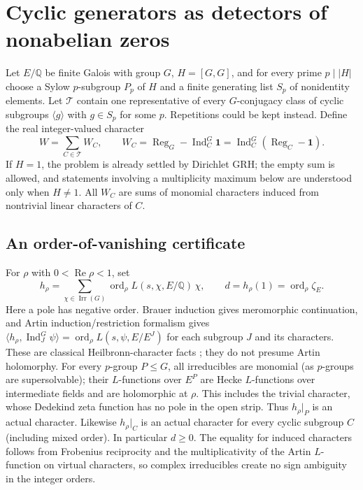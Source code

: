 \documentclass[11pt]{article}
\theoremstyle{remark}\newtheorem{remark}[theorem]{Remark}
\DeclareMathOperator{\ord}{ord}
\DeclareMathOperator{\Ind}{Ind}
\DeclareMathOperator{\Reg}{Reg}
\DeclareMathOperator{\Ree}{Re}
\newcommand{\Q}{\mathbb Q}
\newcommand{\one}{\mathbf 1}
\begin{document}
\section{Cyclic generators as detectors of nonabelian zeros}
Let $E/\Q$ be finite Galois with group $G$, $H=[G,G]$, and for every
prime $p\mid |H|$ choose a Sylow $p$-subgroup $P_p$ of $H$ and a
finite generating list $S_p$ of nonidentity elements. Let $\mathcal T$
contain one representative of every $G$-conjugacy class of cyclic
subgroups $\langle g\rangle$ with $g\in S_p$ for some $p$. Repetitions
could be kept instead. Define the real integer-valued character
\begin{equation}\label{eq:W}
 W=\sum_{C\in\mathcal T} W_C,\qquad
 W_C=\Reg_G-\Ind_C^G\one
     =\Ind_C^G(\Reg_C-\one).
\end{equation}
If $H=1$, the problem is already settled by Dirichlet GRH; the empty
sum is allowed, and statements involving a multiplicity maximum below
are understood only when $H\ne1$. All $W_C$ are sums of monomial
characters induced from nontrivial linear characters of $C$.

\subsection{An order-of-vanishing certificate}
For $\rho$ with $0<\Ree\rho<1$, set
\[
 h_\rho=\sum_{\chi\in\operatorname{Irr}(G)}
    \ord_\rho L(s,\chi,E/\Q)\,\chi,\qquad
 d=h_\rho(1)=\ord_\rho\zeta_E.
\]
Here a pole has negative order. Brauer induction gives meromorphic
continuation, and Artin induction/restriction formalism gives
$\langle h_\rho,\Ind_J^G\psi\rangle=\ord_\rho L(s,\psi,E/E^J)$
for each subgroup $J$ and its characters. These are classical
Heilbronn-character facts \cite{heilbronn}; they do not presume Artin
holomorphy. For every $p$-group $P\le G$, all irreducibles are monomial
(as $p$-groups are supersolvable); their $L$-functions over $E^P$ are
Hecke $L$-functions over intermediate fields and are holomorphic at
$\rho$. This includes the trivial character, whose Dedekind zeta
function has no pole in the open strip. Thus $h_\rho|_P$ is an actual
character. Likewise $h_\rho|_C$ is an actual character for every
cyclic subgroup $C$ (including mixed order). In particular $d\ge0$.
The equality for induced characters follows from Frobenius reciprocity
and the multiplicativity of the Artin $L$-function on virtual
characters, so complex irreducibles create no sign ambiguity in the
integer orders.
\end{document}
